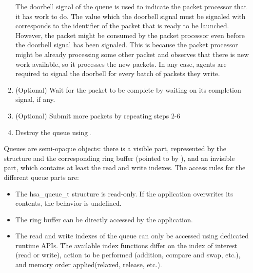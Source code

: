 \documentclass[final,oneside]{book}
\begin{document}
\begin{enumerate}[itemsep=1pt,topsep=3pt,partopsep=0pt]
  The doorbell signal of the queue is used to indicate the packet processor that
  it has work to do. The value which the doorbell signal must be signaled with
  corresponds to the identifier of the packet that is ready to be launched.
  However, the packet might be consumed by the packet processor even before the
  doorbell signal has been signaled. This is because the packet processor might
  be already processing some other packet and observes that there is new work
  available, so it processes the new packets. In any case, agents are
  required to signal the doorbell for every batch of packets they write.

\item (Optional) Wait for the packet to be complete by waiting on its completion
  signal, if any.

\item (Optional) Submit more packets by repeating steps 2-6

\item Destroy the queue using .
\end{enumerate}

Queues are semi-opaque objects: there is a visible part, represented by the
 structure and the corresponding ring buffer (pointed to by
), and an invisible part, which contains at
least the read and write indexes. The access rules for the different queue parts
are:
\begin{itemize}[itemsep=1pt,topsep=3pt,partopsep=0pt]
\item The {hsa_queue_t} structure is read-only. If the application overwrites
  its contents, the behavior is undefined.
\item The ring buffer can be directly accessed by the application.
\item The read and write indexes of the queue can only be accessed using
  dedicated runtime APIs.  The available index functions differ on the index of
  interest (read or write), action to be performed (addition, compare and swap,
  etc.), and memory order applied(relaxed, release, etc.).
\end{itemize}


\end{document}
